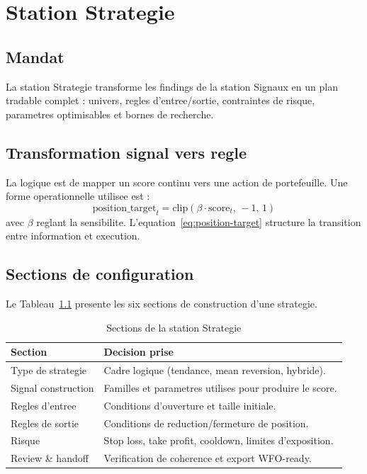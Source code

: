 \chapter{Station Strategie}

\section{Mandat}
La station Strategie transforme les findings de la station Signaux en un plan
tradable complet : univers, regles d'entree/sortie, contraintes de risque,
parametres optimisables et bornes de recherche.

\section{Transformation signal vers regle}
La logique est de mapper un score continu vers une action de portefeuille. Une
forme operationnelle utilisee est :
\begin{equation}
\text{position\_target}_t = \mathrm{clip}\left(\beta \cdot
\text{score}_t,\,-1,\,1\right)
\label{eq:position-target}
\end{equation}
avec $\beta$ reglant la sensibilite. L'equation~\ref{eq:position-target}
structure la transition entre information et execution.

\section{Sections de configuration}
Le Tableau~\ref{tab:strategy-sections} presente les six sections de
construction d'une strategie.

\begin{table}[H]
\centering
\caption{Sections de la station Strategie}
\label{tab:strategy-sections}
\begin{tabular}{p{3.8cm}p{8.8cm}}
\toprule
\textbf{Section} & \textbf{Decision prise} \\
\midrule
Type de strategie & Cadre logique (tendance, mean reversion, hybride). \\
Signal construction & Familles et parametres utilises pour produire le score. \\
Regles d'entree & Conditions d'ouverture et taille initiale. \\
Regles de sortie & Conditions de reduction/fermeture de position. \\
Risque & Stop loss, take profit, cooldown, limites d'exposition. \\
Review \& handoff & Verification de coherence et export WFO-ready. \\
\bottomrule
\end{tabular}
\end{table}

